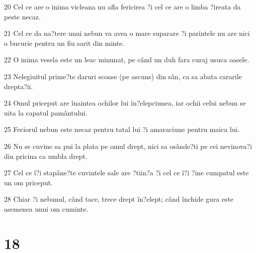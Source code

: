\par 20 Cel ce are o inima vicleana nu afla fericirea ?i cel ce are o limba ?ireata da peste necaz.
\par 21 Cel ce da na?tere unui nebun va avea o mare suparare ?i parintele nu are nici o bucurie pentru un fiu sarit din minte.
\par 22 O inima vesela este un leac minunat, pe când un duh fara curaj usuca oasele.
\par 23 Nelegiuitul prime?te daruri scoase (pe ascuns) din sân, ca sa abata cararile drepta?ii.
\par 24 Omul priceput are înaintea ochilor lui în?elepciunea, iar ochii celui nebun se uita la capatul pamântului.
\par 25 Feciorul nebun este necaz pentru tatal lui ?i amaraciune pentru maica lui.
\par 26 Nu se cuvine sa pui la plata pe omul drept, nici sa osânde?ti pe cei nevinova?i din pricina ca umbla drept.
\par 27 Cel ce î?i stapâne?te cuvintele sale are ?tiin?a ?i cel ce î?i ?ine cumpatul este un om priceput.
\par 28 Chiar ?i nebunul, când tace, trece drept în?elept; când închide gura este asemenea unui om cuminte.

\chapter{18}

